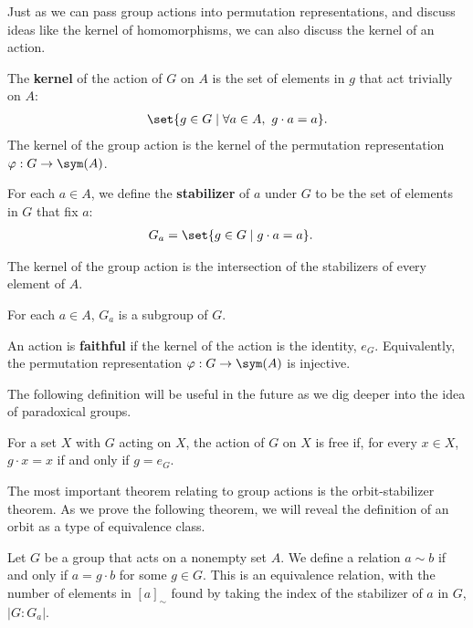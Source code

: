 Just as we can pass group actions into permutation representations, and discuss ideas like the kernel of homomorphisms, we can also discuss the kernel of an action.
\begin{definition}[Kernel]
  The \textbf{kernel} of the action of $G$ on $A$ is the set of elements in $g$ that act trivially on $A$:
  \begin{align*}
    \set{g\in G\mid \forall a\in A,~g\cdot a = a}.
  \end{align*}
  The kernel of the group action is the kernel of the permutation representation $\varphi: G\rightarrow \sym(A)$.
\end{definition}
\begin{definition}[Stabilizer]
  For each $a\in A$, we define the \textbf{stabilizer} of $a$ under $G$ to be the set of elements in $G$ that fix $a$:
  \begin{align*}
    G_a &= \set{g\in G\mid g\cdot a = a}.
  \end{align*}
\end{definition}
\begin{remark}
The kernel of the group action is the intersection of the stabilizers of every element of $A$.\newline

For each $a\in A$, $G_{a}$ is a subgroup of $G$.
\end{remark}
\begin{definition}
  An action is \textbf{faithful} if the kernel of the action is the identity, $e_G$. Equivalently, the permutation representation $\varphi: G\rightarrow \sym(A)$ is injective.
\end{definition}
The following definition will be useful in the future as we dig deeper into the idea of paradoxical groups.
\begin{definition}
For a set $X$ with $G$ acting on $X$, the action of $G$ on $X$ is free if, for every $x\in X$, $g\cdot x = x$ if and only if $g = e_G$.
\end{definition}
The most important theorem relating to group actions is the orbit-stabilizer theorem. As we prove the following theorem, we will reveal the definition of an orbit as a type of equivalence class.
\begin{theorem}
  Let $G$ be a group that acts on a nonempty set $A$. We define a relation $a\sim b$ if and only if $a = g\cdot b$ for some $g\in G$. This is an equivalence relation, with the number of elements in $\left[a\right]_{\sim}$ found by taking the index of the stabilizer of $a$ in $G$, $\left\vert G:G_a \right\vert$.
\end{theorem}

